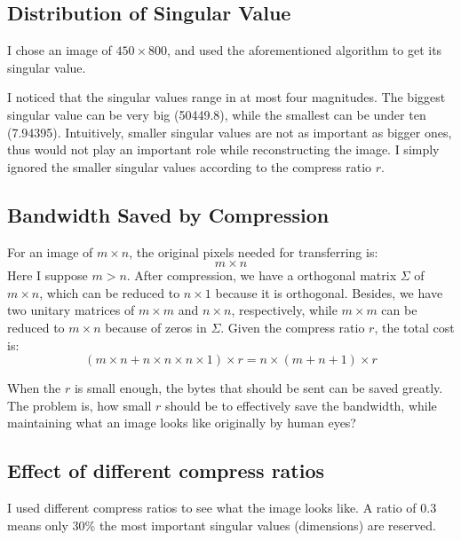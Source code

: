 \documentclass{article}
\begin{document}
        \subsection{Distribution of Singular Value}
            \par
            I chose an image of $450 \times 800$,
            and used the aforementioned algorithm to get its singular value.
            \par
            I noticed that the singular values range in at most four magnitudes.
            The biggest singular value can be very big (50449.8),
            while the smallest can be under ten (7.94395).
            Intuitively, smaller singular values are not as important as bigger ones,
            thus would not play an important role while reconstructing the image.
            I simply ignored the smaller singular values according to the compress ratio $r$.

        \subsection{Bandwidth Saved by Compression}
            \par
            For an image of $m \times n$,
            the original pixels needed for transferring is: $$m \times n$$
            Here I suppose $m > n$.
            After compression, we have a orthogonal matrix $\Sigma$ of $m \times n$,
            which can be reduced to $n \times 1$ because it is orthogonal.
            Besides, we have two unitary matrices of $m \times m$ and $n \times n$, respectively,
            while $m \times m$ can be reduced to $m \times n$ because of zeros in $\Sigma$.
            Given the compress ratio $r$,
            the total cost is:
            $$(m \times n + n \times n \times n \times 1) \times r = n \times (m + n + 1) \times r$$
            \par
            When the $r$ is small enough, the bytes that should be sent can be saved greatly.
            The problem is, how small $r$ should be to effectively save the bandwidth,
            while maintaining what an image looks like originally by human eyes?

        \subsection{Effect of different compress ratios}
            \par
            I used different compress ratios to see what the image looks like.
            A ratio of 0.3 means only 30\%
            the most important singular values (dimensions) are reserved.
\end{document}
